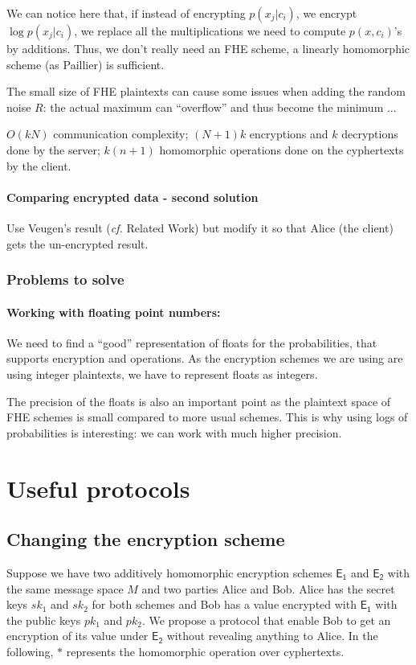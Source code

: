 \documentclass[11pt]{article}
\begin{document}
	We can notice here that, if instead of encrypting $p(x_j|c_i)$, we encrypt $\log p(x_j|c_i)$, we replace all the multiplications we need to compute $p(x,c_i)$'s by additions. Thus, we don't really need an FHE scheme, a linearly homomorphic scheme (as Paillier) is sufficient. 
	
	The small size of FHE plaintexts can cause some issues when adding the random noise $R$: the actual maximum can ``overflow'' and thus become the minimum ...
	
	$O(kN)$ communication complexity; $(N+1)k$ encryptions and $k$ decryptions done by the server; $k(n+1)$ homomorphic operations done on the cyphertexts by the client.
	   
	\paragraph{Comparing encrypted data - second solution}
	Use Veugen's result (\emph{cf.} Related Work) but modify it so that Alice (the client) gets the un-encrypted result. 
	  
          
\subsubsection{Problems to solve} %
\label{ssub:problems_bayes}
\paragraph{Working with floating point numbers:} We need to find a ``good'' representation of floats for the probabilities, that supports encryption and operations. As the encryption schemes we are using are using integer plaintexts, we have to represent floats as integers. 

The precision of the floats is also an important point as the plaintext space of FHE schemes is small compared to more usual schemes. This is why using logs of probabilities is interesting: we can work with much higher precision. 

        
\section{Useful protocols} %
\label{sec:useful_protocols}

\subsection{Changing the encryption scheme} %
\label{sub:changing_encryption_scheme}
	Suppose we have two additively homomorphic encryption schemes $\mathsf{E_1}$ and $\mathsf{E_2}$ with the same message space $M$ and two parties Alice and Bob. Alice has the secret keys $sk_1$ and $sk_2$ for both schemes and Bob has a value encrypted with $\mathsf{E_1}$ with the public keys $pk_1$ and $pk_2$. We propose a protocol that enable Bob to get an encryption of its value under $\mathsf{E_2}$ without revealing anything to Alice. In the following, $*$ represents the homomorphic operation over cyphertexts. 
	
\end{document}
